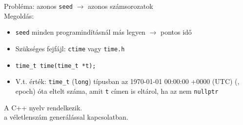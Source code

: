 \documentclass[usenames,dvipsnames,aspectratio=169]{beamer}
\begin{document}
\begin{frame}
  Probléma: azonos \texttt{seed} $\to$ azonos számsorozatok\\
  Megoldás:
  \begin{itemize}
    \item \texttt{seed} minden programindításnál más legyen $\to$ pontos idő
    \item Szükséges fejfájl: \texttt{ctime} vagy \texttt{time.h}
    \item \texttt{time\_t time(time\_t *t);}
    \item V.t. érték: \texttt{time\_t} (\texttt{long}) típusban az 1970-01-01 00:00:00 +0000 (UTC) (, epoch)
óta eltelt  száma, amit \texttt{t} címen is eltárol, ha az nem \texttt{nullptr}
  \end{itemize}
  A C++ nyelv  rendelkezik.\\
   a véletlenszám generálással 
kapcsolatban.
\end{frame}

\begin{frame}
  \small
  \begin{exampleblock}{}
    \vspace{-.2cm}
    \scriptsize
    
    \vspace{-.2cm}
  \end{exampleblock}
\end{frame}
\end{document}

